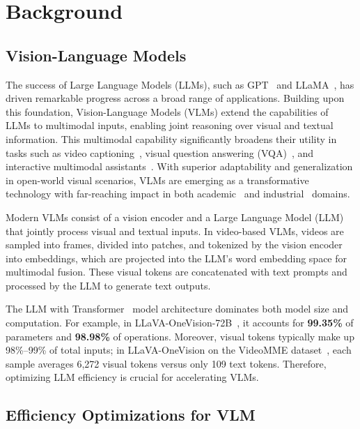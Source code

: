 \section{Background}

\subsection{Vision-Language Models}
The success of Large Language Models (LLMs), such as GPT~\cite{achiam2023gpt} and LLaMA~\cite{touvron2023llama}, has driven remarkable progress across a broad range of applications. Building upon this foundation, Vision-Language Models (VLMs) extend the capabilities of LLMs to multimodal inputs, enabling joint reasoning over visual and textual information. This multimodal capability significantly broadens their utility in tasks such as video captioning~\cite{maeda2024vlm_based_caption_eval}, visual question answering (VQA)~\cite{das2025vlm_continual_vqa,sinha2024guiding_vlm_sel_for_vqa}, and interactive multimodal assistants~\cite{liu2023llava,bordes2024introduction}. 
With superior adaptability and generalization in open-world visual scenarios, VLMs are emerging as a transformative technology with far-reaching impact in both academic~\cite{alayrac2022flamingo,lin2024vila,girdhar2023imagebind} and industrial~\cite{achiam2023gpt,team2024gemini,aws2023titan_multimodal_embeddings} domains.


Modern VLMs consist of a vision encoder and a Large Language Model (LLM) that jointly process visual and textual inputs. 
In video-based VLMs, videos are sampled into frames, divided into patches, and tokenized by the vision encoder into embeddings, which are projected into the LLM’s word embedding space for multimodal fusion. 
These visual tokens are concatenated with text prompts and processed by the LLM to generate text outputs.

The LLM with Transformer~\cite{vaswani2017attention,brown2020language} model architecture dominates both model size and computation. 
For example, in LLaVA-OneVision-72B~\cite{li2024llava}, it accounts for \textbf{99.35\%} of parameters and \textbf{98.98\%} of operations. 
{Moreover, visual tokens typically make up 98\%–99\% of total inputs; in LLaVA-OneVision on the VideoMME dataset~\cite{fu2025video}, each sample averages 6,272 visual tokens versus only 109 text tokens.} 
Therefore, optimizing LLM efficiency is crucial for accelerating VLMs.

\subsection{Efficiency Optimizations for VLM}

